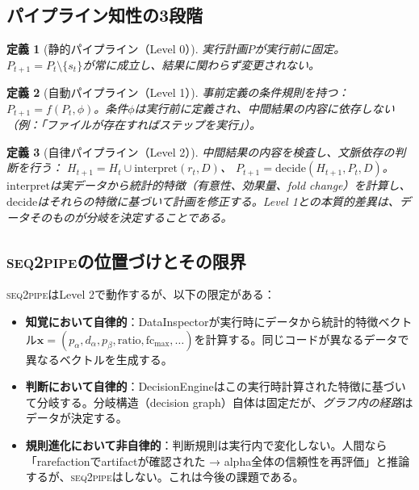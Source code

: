 \documentclass[11pt,a4paper]{article}
\newtheorem{definition}{定義}
\newcommand{\seqpipe}{\textsc{seq2pipe}}
\begin{document}
\subsection{パイプライン知性の3段階}

\begin{definition}[静的パイプライン（Level 0）]
実行計画$P$が実行前に固定。$P_{t+1} = P_t \setminus \{s_t\}$が常に成立し、結果に関わらず変更されない。
\end{definition}

\begin{definition}[自動パイプライン（Level 1）]
事前定義の条件規則を持つ：$P_{t+1} = f(P_t, \phi)$。条件$\phi$は実行前に定義され、中間結果の\emph{内容}に依存しない（例：「ファイルが存在すればステップを実行」）。
\end{definition}

\begin{definition}[自律パイプライン（Level 2）]
中間結果の\emph{内容を検査}し、文脈依存の判断を行う：
$H_{t+1} = H_t \cup \mathrm{interpret}(r_t, D)$、
$P_{t+1} = \mathrm{decide}(H_{t+1}, P_t, D)$。
$\mathrm{interpret}$は実データから統計的特徴（有意性、効果量、fold change）を計算し、$\mathrm{decide}$はそれらの特徴に基づいて計画を修正する。Level 1との本質的差異は、\emph{データそのもの}が分岐を決定することである。
\end{definition}

\subsection{\seqpipe の位置づけとその限界}

\seqpipe はLevel 2で動作するが、以下の限定がある：
\begin{itemize}
  \item \textbf{知覚において自律的}：DataInspectorが実行時にデータから統計的特徴ベクトル$\mathbf{x} = (p_\alpha, d_\alpha, p_\beta, \mathrm{ratio}, \mathrm{fc}_{\max}, \ldots)$を計算する。同じコードが異なるデータで異なるベクトルを生成する。
  \item \textbf{判断において自律的}：DecisionEngineはこの実行時計算された特徴に基づいて分岐する。分岐構造（decision graph）自体は固定だが、\emph{グラフ内の経路}はデータが決定する。
  \item \textbf{規則進化において非自律的}：判断規則は実行内で変化しない。人間なら「rarefactionでartifactが確認された → alpha全体の信頼性を再評価」と推論するが、\seqpipe はしない。これは今後の課題である。
\end{itemize}
\end{document}
